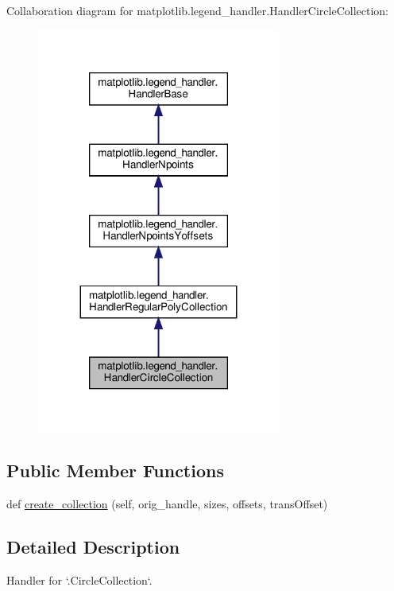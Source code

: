 Collaboration diagram for matplotlib.\+legend\+\_\+handler.\+Handler\+Circle\+Collection\+:
\nopagebreak
\begin{figure}[H]
\begin{center}
\leavevmode
\includegraphics[width=227pt]{classmatplotlib_1_1legend__handler_1_1HandlerCircleCollection__coll__graph}
\end{center}
\end{figure}
\subsection*{Public Member Functions}
\begin{DoxyCompactItemize}
\item 
def \hyperlink{classmatplotlib_1_1legend__handler_1_1HandlerCircleCollection_af221047c204befc67a40801a0b4b6db6}{create\+\_\+collection} (self, orig\+\_\+handle, sizes, offsets, trans\+Offset)
\end{DoxyCompactItemize}


\subsection{Detailed Description}
\begin{DoxyVerb}Handler for `.CircleCollection`\s.\end{DoxyVerb}
 

